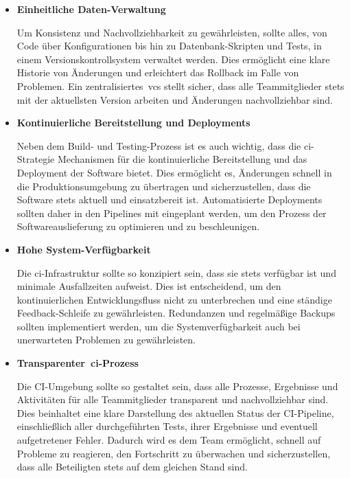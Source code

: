 \begin{itemize}
    \item {
        \textbf{Einheitliche Daten-Verwaltung}\par
        Um Konsistenz und Nachvollziehbarkeit zu gewährleisten, sollte alles, von Code über Konfigurationen bis hin
        zu Datenbank-Skripten und Tests, in einem Versionskontrollsystem verwaltet werden.
        Dies ermöglicht eine klare Historie von Änderungen und erleichtert das Rollback im Falle von Problemen.
        Ein zentralisiertes\ \acrshort{vcs} stellt sicher, dass alle Teammitglieder stets mit der aktuellsten Version
        arbeiten und Änderungen nachvollziehbar sind.
    }

    \item {
        \textbf{Kontinuierliche Bereitstellung und Deployments}\par
        Neben dem Build- und Testing-Prozess ist es auch wichtig, dass die \acrshort{ci}-Strategie Mechanismen für die
        kontinuierliche Bereitstellung und das Deployment der Software bietet.
        Dies ermöglicht es, Änderungen schnell in die Produktionsumgebung zu übertragen und sicherzustellen, dass die
        Software stets aktuell und einsatzbereit ist.
        Automatisierte Deployments sollten daher in den Pipelines mit eingeplant werden, um den Prozess der
        Softwareauslieferung zu optimieren und zu beschleunigen.
    }

    \item {
        \textbf{Hohe System-Verfügbarkeit}\par
        Die \acrshort{ci}-Infrastruktur sollte so konzipiert sein, dass sie stets verfügbar ist und minimale Ausfallzeiten
        aufweist. Dies ist entscheidend, um den kontinuierlichen Entwicklungsfluss nicht zu unterbrechen und eine
        ständige Feedback-Schleife zu gewährleisten.
        Redundanzen und regelmäßige Backups sollten implementiert werden, um die Systemverfügbarkeit auch bei
        unerwarteten Problemen zu gewährleisten.
    }

    \item {
        \textbf{Transparenter\ \acrshort{ci}-Prozess}\par
        Die CI-Umgebung sollte so gestaltet sein, dass alle Prozesse, Ergebnisse und Aktivitäten für alle Teammitglieder
        transparent und nachvollziehbar sind.
        Dies beinhaltet eine klare Darstellung des aktuellen Status der CI-Pipeline, einschließlich aller durchgeführten
        Tests, ihrer Ergebnisse und eventuell aufgetretener Fehler.
        Dadurch wird es dem Team ermöglicht, schnell auf Probleme zu reagieren, den Fortschritt zu überwachen und
        sicherzustellen, dass alle Beteiligten stets auf dem gleichen Stand sind.
    }
\end{itemize}

